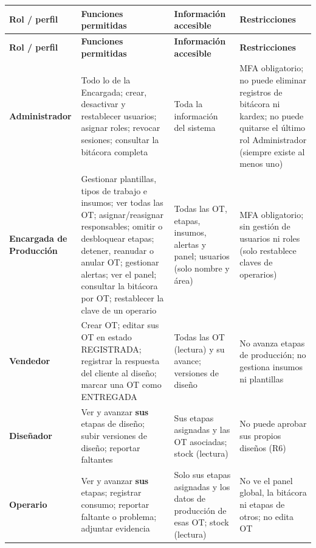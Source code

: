 \documentclass[11pt,a4paper]{article}
\begin{document}
\begingroup\small
\begin{longtable}{@{}>{\raggedright\arraybackslash\hspace{0pt}}p{}>{\raggedright\arraybackslash\hspace{0pt}}p{}>{\raggedright\arraybackslash\hspace{0pt}}p{}>{\raggedright\arraybackslash\hspace{0pt}}p{}@{}}
\toprule
\textbf{Rol / perfil} & \textbf{Funciones permitidas} & \textbf{Información accesible} & \textbf{Restricciones} \\ \midrule
\endfirsthead
\toprule
\textbf{Rol / perfil} & \textbf{Funciones permitidas} & \textbf{Información accesible} & \textbf{Restricciones} \\ \midrule
\endhead
\bottomrule
\endlastfoot
\textbf{Administrador} & Todo lo de la Encargada; crear, desactivar y restablecer usuarios; asignar roles; revocar sesiones; consultar la bitácora completa & Toda la información del sistema & MFA obligatorio; no puede eliminar registros de bitácora ni kardex; no puede quitarse el último rol Administrador (siempre existe al menos uno) \\ \addlinespace[0.25em]
\textbf{Encargada de Producción} & Gestionar plantillas, tipos de trabajo e insumos; ver todas las OT; asignar/reasignar responsables; omitir o desbloquear etapas; detener, reanudar o anular OT; gestionar alertas; ver el panel; consultar la bitácora por OT; restablecer la clave de un operario & Todas las OT, etapas, insumos, alertas y panel; usuarios (solo nombre y área) & MFA obligatorio; sin gestión de usuarios ni roles (solo restablece claves de operarios) \\ \addlinespace[0.25em]
\textbf{Vendedor} & Crear OT; editar sus OT en estado REGISTRADA; registrar la respuesta del cliente al diseño; marcar una OT como ENTREGADA & Todas las OT (lectura) y su avance; versiones de diseño & No avanza etapas de producción; no gestiona insumos ni plantillas \\ \addlinespace[0.25em]
\textbf{Diseñador} & Ver y avanzar \textbf{sus} etapas de diseño; subir versiones de diseño; reportar faltantes & Sus etapas asignadas y las OT asociadas; stock (lectura) & No puede aprobar sus propios diseños (R6) \\ \addlinespace[0.25em]
\textbf{Operario} & Ver y avanzar \textbf{sus} etapas; registrar consumo; reportar faltante o problema; adjuntar evidencia & Solo sus etapas asignadas y los datos de producción de esas OT; stock (lectura) & No ve el panel global, la bitácora ni etapas de otros; no edita OT \\
\end{longtable}
\endgroup
\end{document}
